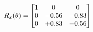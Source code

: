 \documentclass[preview]{standalone}
\begin{document}
\begin{align*}
\special{dvisvgm:raw <g id='unique000'>}R_{x}(\theta) = \begin{bmatrix}1 & 0 & 0 \\0 & -0.56 & -0.83 \\0 & +0.83 & -0.56\end{bmatrix}\special{dvisvgm:raw </g>}
\end{align*}
\end{document}
